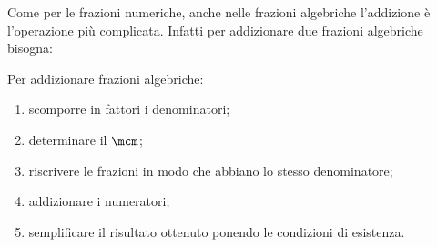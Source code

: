 Come per le frazioni numeriche, anche nelle frazioni algebriche l'addizione
è l'operazione più complicata. Infatti per addizionare due frazioni 
algebriche bisogna:

\begin{procedura}{}{}
Per addizionare frazioni algebriche:
\begin{enumerate} [label=\alpha), noitemsep]
\item scomporre in fattori i denominatori;
\item determinare il \(\mcm\);
\item riscrivere le frazioni in modo che abbiano lo stesso denominatore;
\item addizionare i numeratori;
\item semplificare il risultato ottenuto ponendo le condizioni di esistenza.
\end{enumerate}
\end{procedura}

